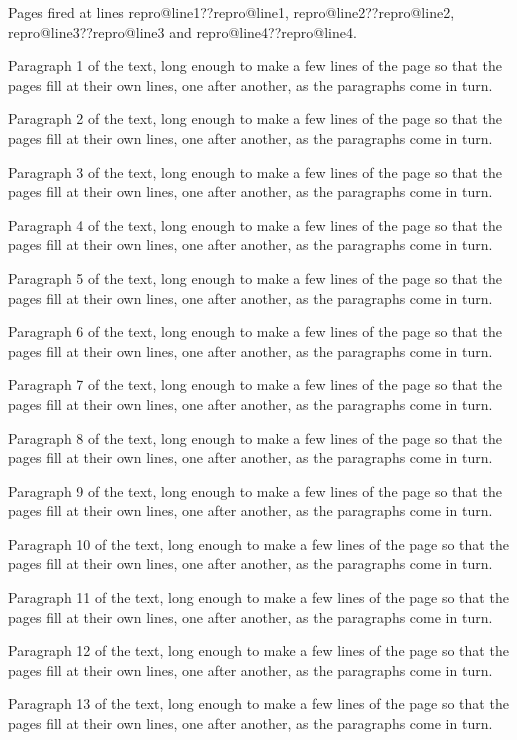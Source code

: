\documentclass{article}
\makeatletter
\def\firedat#1{\expandafter\ifx\csname repro@line#1\endcsname\relax ??\else\csname repro@line#1\endcsname\fi}
\makeatother
\begin{document}
Pages fired at lines \firedat{1}, \firedat{2}, \firedat{3} and \firedat{4}.

Paragraph 1 of the text, long enough to make a few lines of the page so that the
pages fill at their own lines, one after another, as the paragraphs come in turn.

Paragraph 2 of the text, long enough to make a few lines of the page so that the
pages fill at their own lines, one after another, as the paragraphs come in turn.

Paragraph 3 of the text, long enough to make a few lines of the page so that the
pages fill at their own lines, one after another, as the paragraphs come in turn.

Paragraph 4 of the text, long enough to make a few lines of the page so that the
pages fill at their own lines, one after another, as the paragraphs come in turn.

Paragraph 5 of the text, long enough to make a few lines of the page so that the
pages fill at their own lines, one after another, as the paragraphs come in turn.

Paragraph 6 of the text, long enough to make a few lines of the page so that the
pages fill at their own lines, one after another, as the paragraphs come in turn.

Paragraph 7 of the text, long enough to make a few lines of the page so that the
pages fill at their own lines, one after another, as the paragraphs come in turn.

Paragraph 8 of the text, long enough to make a few lines of the page so that the
pages fill at their own lines, one after another, as the paragraphs come in turn.

Paragraph 9 of the text, long enough to make a few lines of the page so that the
pages fill at their own lines, one after another, as the paragraphs come in turn.

Paragraph 10 of the text, long enough to make a few lines of the page so that the
pages fill at their own lines, one after another, as the paragraphs come in turn.

Paragraph 11 of the text, long enough to make a few lines of the page so that the
pages fill at their own lines, one after another, as the paragraphs come in turn.

Paragraph 12 of the text, long enough to make a few lines of the page so that the
pages fill at their own lines, one after another, as the paragraphs come in turn.

Paragraph 13 of the text, long enough to make a few lines of the page so that the
pages fill at their own lines, one after another, as the paragraphs come in turn.
\end{document}

